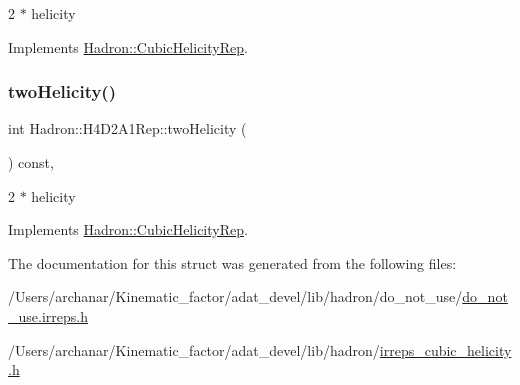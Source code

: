 2 $\ast$ helicity 

Implements \mbox{\hyperlink{structHadron_1_1CubicHelicityRep_af507aa56fc2747eacc8cb6c96db31ecc}{Hadron\+::\+Cubic\+Helicity\+Rep}}.

\mbox{\label{structHadron_1_1H4D2A1Rep_ade522129ee7018a431237c9d04e13351}} 
\subsubsection{\texorpdfstring{twoHelicity()}{twoHelicity()}\hspace{0.1cm}{\footnotesize\ttfamily [2/2]}}
{\footnotesize\ttfamily int Hadron\+::\+H4\+D2\+A1\+Rep\+::two\+Helicity (\begin{DoxyParamCaption}{ }\end{DoxyParamCaption}) const\hspace{0.3cm}{\ttfamily [inline]}, {\ttfamily [virtual]}}

2 $\ast$ helicity 

Implements \mbox{\hyperlink{structHadron_1_1CubicHelicityRep_af507aa56fc2747eacc8cb6c96db31ecc}{Hadron\+::\+Cubic\+Helicity\+Rep}}.



The documentation for this struct was generated from the following files\+:\begin{DoxyCompactItemize}
\item 
/\+Users/archanar/\+Kinematic\+\_\+factor/adat\+\_\+devel/lib/hadron/do\+\_\+not\+\_\+use/\mbox{\hyperlink{do__not__use_8irreps_8h}{do\+\_\+not\+\_\+use.\+irreps.\+h}}\item 
/\+Users/archanar/\+Kinematic\+\_\+factor/adat\+\_\+devel/lib/hadron/\mbox{\hyperlink{lib_2hadron_2irreps__cubic__helicity_8h}{irreps\+\_\+cubic\+\_\+helicity.\+h}}\end{DoxyCompactItemize}
